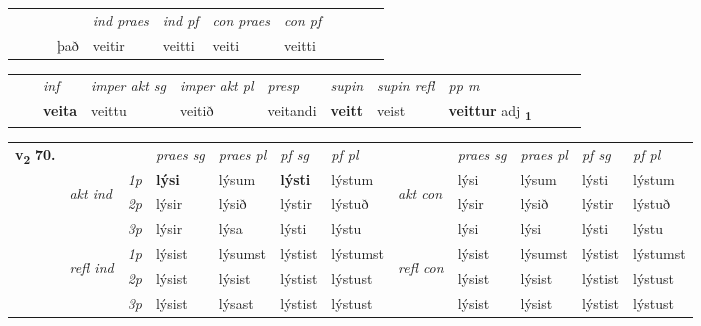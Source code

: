 \begin{tabular}{llllllllllll}
 & &  & &  \textit{ind praes} & \textit{ind pf} & \textit{con praes} & \textit{con pf} \\*
&  & & það & veitir & veitti & veiti & veitti \\*
\cmidrule{5-9}
\end{tabular}


\begin{tabular}{llllllllllll}
 & & \textit{inf} & \textit{imper akt sg} & \textit{imper akt pl}   & \textit{presp} & \textit{supin} & \textit{supin refl} & \textit{pp m}     \\*
  & & \textbf{veita} & veittu  & veitið   & veitandi &  \textbf{veitt} & veist & \textbf{veittur} adj \textbf{\textsubscript{1}} \\*
\cmidrule{1-12}
\end{tabular}



\begin{tabular}{llllllllllll} \toprule
\multirow{4}{*}{{{\textbf{v{\textsubscript{2}}} \Large{\textbf{70.}}}}}  & &   &  \textit{praes sg}  & \textit{praes pl}  &\textit{ pf sg} & \textit{pf pl} &  &  \textit{praes sg}  & \textit{praes pl}  & \textit{pf sg} & \textit{pf pl } \\*
	\cmidrule{4-7} \cmidrule{9-12}
 & \multirow{3}{*}{\begin{turn}{90}\textit{akt ind}\end{turn}} & {\textit{1p}} & \textbf{lýsi} & lýsum    & \textbf{lýsti} & lýstum & \multirow{3}{*}{\begin{turn}{90}\textit{akt con}\end{turn}} &lýsi & lýsum & lýsti & lýstum\\*
& &  {\textit{2p}} &  lýsir  & lýsið   & lýstir & lýstuð & & lýsir & lýsið & lýstir & lýstuð \\*
& &  {\textit{3p}} & lýsir & lýsa   & lýsti & lýstu & & lýsi & lýsi& lýsti & lýstu  \\*
\cmidrule{4-7} \cmidrule{9-12}
 &\multirow{3}{*}{\begin{turn}{90}\textit{refl ind}\end{turn}} & {\textit{1p}} & lýsist & lýsumst    & lýstist & lýstumst & \multirow{3}{*}{\begin{turn}{90}\textit{refl con}\end{turn}}  &lýsist & lýsumst & lýstist & lýstumst\\*
 &&  {\textit{2p}} &  lýsist  & lýsist   & lýstist & lýstust & &lýsist & lýsist & lýstist & lýstust \\*
& &  {\textit{3p}} & lýsist & lýsast   & lýstist & lýstust & & lýsist & lýsist& lýstist & lýstust  \\*
\cmidrule{4-7} \cmidrule{9-12}
\end{tabular}


